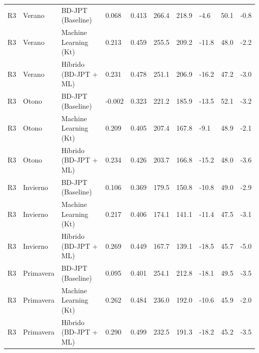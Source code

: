 \begin{table}[htpb]
\begin{tabular}{llllllllll}
R3 & Verano & BD-JPT (Baseline) & 0.068 & 0.413 & 266.4 & 218.9 & -4.6 & 50.1 & -0.8 \\
R3 & Verano & Machine Learning (Kt) & 0.213 & 0.459 & 255.5 & 209.2 & -11.8 & 48.0 & -2.2 \\
R3 & Verano & Híbrido (BD-JPT + ML) & 0.231 & 0.478 & 251.1 & 206.9 & -16.2 & 47.2 & -3.0 \\
R3 & Otono & BD-JPT (Baseline) & -0.002 & 0.323 & 221.2 & 185.9 & -13.5 & 52.1 & -3.2 \\
R3 & Otono & Machine Learning (Kt) & 0.209 & 0.405 & 207.4 & 167.8 & -9.1 & 48.9 & -2.1 \\
R3 & Otono & Híbrido (BD-JPT + ML) & 0.234 & 0.426 & 203.7 & 166.8 & -15.2 & 48.0 & -3.6 \\
R3 & Invierno & BD-JPT (Baseline) & 0.106 & 0.369 & 179.5 & 150.8 & -10.8 & 49.0 & -2.9 \\
R3 & Invierno & Machine Learning (Kt) & 0.217 & 0.406 & 174.1 & 141.1 & -11.4 & 47.5 & -3.1 \\
R3 & Invierno & Híbrido (BD-JPT + ML) & 0.269 & 0.449 & 167.7 & 139.1 & -18.5 & 45.7 & -5.0 \\
R3 & Primavera & BD-JPT (Baseline) & 0.095 & 0.401 & 254.1 & 212.8 & -18.1 & 49.5 & -3.5 \\
R3 & Primavera & Machine Learning (Kt) & 0.262 & 0.484 & 236.0 & 192.0 & -10.6 & 45.9 & -2.0 \\
R3 & Primavera & Híbrido (BD-JPT + ML) & 0.290 & 0.499 & 232.5 & 191.3 & -18.2 & 45.2 & -3.5 \\
\bottomrule
\end{tabular}
\end{table}